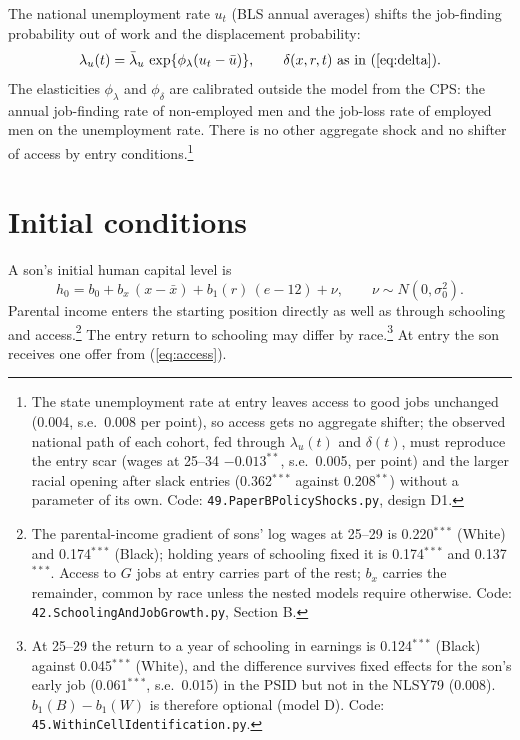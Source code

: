 \documentclass[11pt]{article}
\newcommand{\code}[1]{\texttt{#1}}
\newcommand{\1}{\mathbf{1}}
\begin{document}
The national unemployment rate $u_t$ (BLS annual averages) shifts the job-finding probability out of work and the
displacement probability:
\begin{equation}
\lambda_u(t) = \bar\lambda_u\, \exp\{\phi_\lambda (u_t - \bar u)\}, \qquad \delta(x, r, t) \text{ as in (\ref{eq:delta})}.
\end{equation}
The elasticities $\phi_\lambda$ and $\phi_\delta$ are calibrated outside the model from the CPS: the annual job-finding
rate of non-employed men and the job-loss rate of employed men on the unemployment rate. There is no other aggregate
shock and no shifter of access by entry conditions.\footnote{The state unemployment rate at entry leaves access to good
jobs unchanged (0.004, s.e.\ 0.008 per point), so access gets no aggregate shifter; the observed national path of each
cohort, fed through $\lambda_u(t)$ and $\delta(t)$, must reproduce the entry scar (wages at 25--34 $-0.013^{**}$, s.e.\
0.005, per point) and the larger racial opening after slack entries (0.362$^{***}$ against 0.208$^{**}$) without a
parameter of its own. Code: \code{49.PaperBPolicyShocks.py}, design D1.}

\section{Initial conditions}\label{sec:init}

A son's initial human capital level is
\begin{equation}\label{eq:h0}
h_0 = b_0 + b_x\, (x - \bar x) + b_1(r)\, (e - 12) + \nu, \qquad \nu \sim N(0, \sigma_0^2).
\end{equation}
Parental income enters the starting position directly as well as through schooling and access.\footnote{The
parental-income gradient of sons' log wages at 25--29 is 0.220$^{***}$ (White) and 0.174$^{***}$ (Black); holding years of
schooling fixed it is 0.174$^{***}$ and 0.137$^{***}$. Access to $G$ jobs at entry carries part of the rest; $b_x$ carries
the remainder, common by race unless the nested models require otherwise. Code: \code{42.SchoolingAndJobGrowth.py},
Section B.} The entry return to schooling may differ by race.\footnote{At 25--29 the return to a year of schooling in
earnings is 0.124$^{***}$ (Black) against 0.045$^{***}$ (White), and the difference survives fixed effects for the son's
early job (0.061$^{***}$, s.e.\ 0.015) in the PSID but not in the NLSY79 (0.008). $b_1(B) - b_1(W)$ is therefore
optional (model D). Code: \code{45.WithinCellIdentification.py}.} At entry the son receives one offer from
(\ref{eq:access}).
\end{document}
